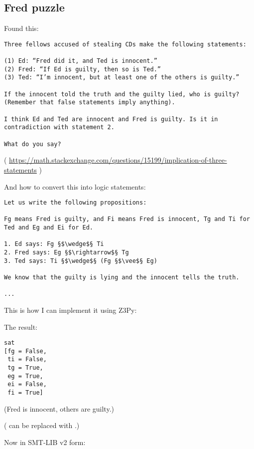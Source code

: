 \subsection{Fred puzzle}

Found this:

\begin{lstlisting}
Three fellows accused of stealing CDs make the following statements:

(1) Ed: “Fred did it, and Ted is innocent.”
(2) Fred: “If Ed is guilty, then so is Ted.”
(3) Ted: “I’m innocent, but at least one of the others is guilty.”

If the innocent told the truth and the guilty lied, who is guilty? (Remember that false statements imply anything).

I think Ed and Ted are innocent and Fred is guilty. Is it in contradiction with statement 2.

What do you say?
\end{lstlisting}

( \url{https://math.stackexchange.com/questions/15199/implication-of-three-statements} )

And how to convert this into logic statements:

\begin{lstlisting}
Let us write the following propositions:

Fg means Fred is guilty, and Fi means Fred is innocent, Tg and Ti for Ted and Eg and Ei for Ed.

1. Ed says: Fg §$\wedge$§ Ti
2. Fred says: Eg §$\rightarrow$§ Tg
3. Ted says: Ti §$\wedge$§ (Fg §$\vee$§ Eg)

We know that the guilty is lying and the innocent tells the truth.

...

\end{lstlisting}

This is how I can implement it using Z3Py:



The result:

\begin{lstlisting}
sat
[fg = False,
 ti = False,
 tg = True,
 eg = True,
 ei = False,
 fi = True]
\end{lstlisting}

(Fred is innocent, others are guilty.)

( can be replaced with .)

Now in SMT-LIB v2 form:

